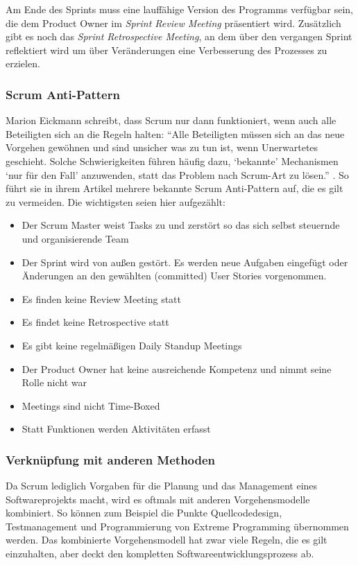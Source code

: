 Am Ende des Sprints muss eine lauffähige Version des Programms verfügbar sein, die dem Product Owner im \emph{Sprint Review Meeting} präsentiert wird. Zusätzlich gibt es noch das \emph{Sprint Retrospective Meeting}, an dem über den vergangen Sprint reflektiert wird um über Veränderungen eine Verbesserung des Prozesses zu erzielen.

\subsubsection{Scrum Anti-Pattern}
Marion Eickmann schreibt, dass Scrum nur dann funktioniert, wenn auch alle Beteiligten sich an die Regeln halten: ``Alle Beteiligten müssen sich an das neue Vorgehen gewöhnen und sind unsicher was zu tun ist, wenn Unerwartetes geschieht. Solche Schwierigkeiten führen häufig dazu, `bekannte' Mechanismen `nur für den Fall' anzuwenden, statt das Problem nach Scrum-Art zu lösen.'' \cite[S. 84]{bib:ix2010}. So führt sie in ihrem Artikel mehrere bekannte Scrum Anti-Pattern auf, die es gilt zu vermeiden. Die wichtigsten seien hier aufgezählt:
\begin{itemize}
  \item Der Scrum Master weist Tasks zu und zerstört so das sich selbst steuernde und organisierende Team
  \item Der Sprint wird von außen gestört. Es werden neue Aufgaben eingefügt oder Änderungen an den gewählten (committed) User Stories vorgenommen.
  \item Es finden keine Review Meeting statt
  \item Es findet keine Retrospective statt
  \item Es gibt keine regelmäßigen Daily Standup Meetings
  \item Der Product Owner hat keine ausreichende Kompetenz und nimmt seine Rolle nicht war
  \item Meetings sind nicht Time-Boxed
  \item Statt Funktionen werden Aktivitäten erfasst
\end{itemize} 

\subsubsection{Verknüpfung mit anderen Methoden}
Da Scrum lediglich Vorgaben für die Planung und das Management eines Softwareprojekts macht, wird es oftmals mit anderen Vorgehensmodelle kombiniert. So können zum Beispiel die Punkte Quellcodedesign, Testmanagement und Programmierung von Extreme Programming übernommen werden. Das kombinierte Vorgehensmodell hat zwar viele Regeln, die es gilt einzuhalten, aber deckt den kompletten Softwareentwicklungsprozess ab.

